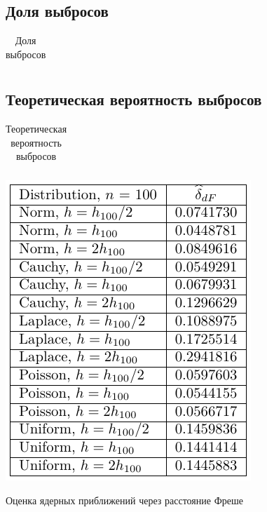 \documentclass[a4paper]{article}
\begin{document}
\subsection{Доля выбросов}
\begin{table}[H]
    \centering
    \begin{tabular}{|C{2.6 cm}|C{2.6 cm}|C{2.6 cm}|}
        \hline
        
    \end{tabular}
    \caption{Доля выбросов}
    \label{tab:outlierstests}
\end{table}
\subsection{Теоретическая вероятность выбросов}
\begin{table}[H]
    \centering
    \begin{tabular}{|c|c|c|c|c|c|}
        \hline
        
    \end{tabular}
    \caption{Теоретическая вероятность выбросов}
    \label{tab:outlierstheory}
\end{table}
\begin{table}[H]
    \centering
    \includegraphics[]{RNotebooks/frechetTests.pdf}
    \caption{Оценка ядерных приближений через расстояние Фреше}
    \label{tab:frechet}
\end{table}
\end{document}

